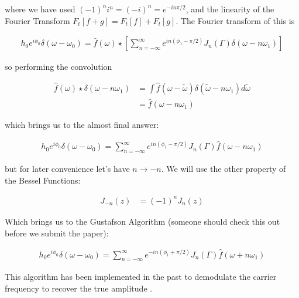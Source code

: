 \documentclass[onecolumn, groupedaddress, 10pt]{revtex4-1}
\begin{document}
where we have used $(-1)^n i^n = (-i)^n = e^{-in\pi/2}$, and the linearity of the Fourier Transform $F_t[f+g]=F_t[f]+F_t[g]$.  The Fourier transform of this is 

\begin{align}
h_0 e^{i\phi_0} \delta (\omega - \omega_0) = \hat{f}(\omega)
\star
\left[ \sum_{n=-\infty}^{\infty} e^{in(\phi_1 - \pi/2)} J_n(\Gamma) \delta (\omega - n\omega_1) \right]
\end{align}

so performing the convolution 

\begin{align}
\hat{f}(\omega) \star \delta (\omega - n\omega_1) 
&= \int \hat{f}(\omega - \widetilde{\omega}) \delta(\widetilde{\omega} - n\omega_1) d\widetilde{\omega}			\\
&= \hat{f} (\omega - n\omega_1)
\end{align}

which brings us to the almost final answer:

\begin{align}
h_0 e^{i\phi_0} \delta (\omega - \omega_0) = \sum_{n=-\infty}^{\infty} e^{in(\phi_1-\pi/2)} J_n(\Gamma) \hat{f} (\omega - n\omega_1)
\end{align}

but for later convenience let's have $n\to -n$.  We will use the other property of the Bessel Functions: \cite{}

\begin{align}
J_{-n} (z) &= (-1)^n J_n(z)
\end{align}

Which brings us to the Gustafson Algorithm (someone should check this out before we submit the paper):


\begin{align}
\label{eqn:gustafsonAlgorithm}
h_0 e^{i\phi_0} \delta (\omega - \omega_0) = \sum_{n=-\infty}^{\infty} e^{-in(\phi_1+\pi/2)} J_n(\Gamma) \hat{f} (\omega + n\omega_1)
\end{align}


This algorithm has been implemented in the past to demodulate the carrier frequency to recover the true amplitude \citep{deanna}.  
\end{document}
